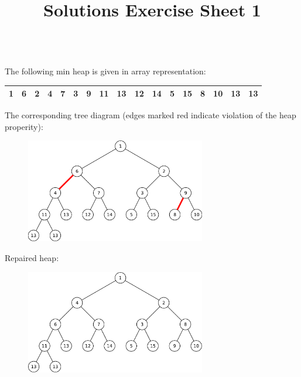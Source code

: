 

\title{Solutions Exercise Sheet 1}

\bigskip

\renewcommand{\baselinestretch}{1.1}\normalsize

 \\[10pt]
The following min heap is given in array representation:
\begin{center}
  \begin{tabular}{|c|c|c|c|c|c|c|c|c|c|c|c|c|c|c|c|c|}
    \hline
     1 & 6 & 2 & 4 & 7 & 3 & 9 & 11 & 13 & 12 & 14 & 5 & 15 & 8 & 10 & 13 & 13 \\
    \hline
  \end{tabular}
\end{center}

The corresponding tree diagram (edges marked red indicate violation of the heap properity):
\begin{figure}[htbp]
	\centering
	\includegraphics[width=0.7\textwidth]{images/A1_1}
\end{figure}

\newpage
Repaired heap:
\newline
\begin{figure}[htbp]
	\centering
	\includegraphics[width=0.7\textwidth]{images/A1_2}
\end{figure}


